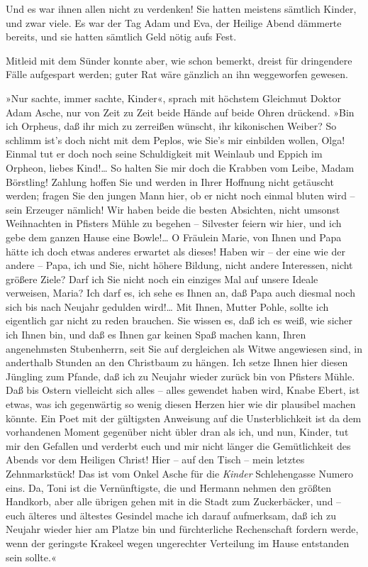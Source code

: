 Und es war ihnen allen nicht zu verdenken! Sie hatten meistens
sämtlich Kinder, und zwar viele. Es war der Tag Adam und Eva, der
Heilige Abend dämmerte bereits, und sie hatten sämtlich Geld nötig
aufs Fest.

Mitleid mit dem Sünder konnte aber, wie schon bemerkt, dreist für
dringendere Fälle aufgespart werden; guter Rat wäre gänzlich an ihn
weggeworfen gewesen.

»Nur sachte, immer sachte, Kinder«, sprach mit höchstem Gleichmut
Doktor Adam Asche, nur von Zeit zu Zeit beide Hände auf beide Ohren
drückend. »Bin ich Orpheus, daß ihr mich zu zerreißen wünscht, ihr
kikonischen Weiber? So schlimm ist's doch nicht mit dem Peplos, wie
Sie's mir einbilden wollen, Olga! Einmal tut er doch noch seine
Schuldigkeit mit Weinlaub und Eppich im Orpheon, liebes Kind!\ldots{} So
halten Sie mir doch die Krabben vom Leibe, Madam Börstling! Zahlung
hoffen Sie und werden in Ihrer Hoffnung nicht getäuscht werden;
fragen Sie den jungen Mann hier, ob er nicht noch einmal bluten
wird – sein Erzeuger nämlich! Wir haben beide die besten Absichten,
nicht umsonst Weihnachten in Pfisters Mühle zu begehen – Silvester
feiern wir hier, und ich gebe dem ganzen Hause eine Bowle!\ldots{} O
Fräulein Marie, von Ihnen und Papa hätte ich doch etwas anderes
erwartet als dieses! Haben wir – der eine wie der andere – Papa,
ich und Sie, nicht höhere Bildung, nicht andere Interessen, nicht
größere Ziele? Darf ich Sie nicht noch ein einziges Mal auf unsere
Ideale verweisen, Maria? Ich darf es, ich sehe es Ihnen an, daß
Papa auch diesmal noch sich bis nach Neujahr gedulden wird!\ldots{} Mit
Ihnen, Mutter Pohle, sollte ich eigentlich gar nicht zu reden
brauchen. Sie wissen es, daß ich es weiß, wie sicher ich Ihnen bin,
und daß es Ihnen gar keinen Spaß machen kann, Ihren angenehmsten
Stubenherrn, seit Sie auf dergleichen als Witwe angewiesen sind, in
anderthalb Stunden an den Christbaum zu hängen. Ich setze Ihnen
hier diesen Jüngling zum Pfande, daß ich zu Neujahr wieder zurück
bin von Pfisters Mühle. Daß bis Ostern vielleicht sich alles –
alles gewendet haben wird, Knabe Ebert, ist etwas, was ich
gegenwärtig so wenig diesen Herzen hier wie dir plausibel machen
könnte. Ein Poet mit der gültigsten Anweisung auf die
Unsterblichkeit ist da dem vorhandenen Moment gegenüber nicht übler
dran als ich, und nun, Kinder, tut mir den Gefallen und verderbt
euch und mir nicht länger die Gemütlichkeit des Abends vor dem
Heiligen Christ! Hier – auf den Tisch – mein letztes Zehnmarkstück!
Das ist vom Onkel Asche für die \emph{Kinder} Schlehengasse Numero
eins. Da, Toni ist die Vernünftigste, die und Hermann nehmen den
größten Handkorb, aber alle übrigen gehen mit in die Stadt zum
Zuckerbäcker, und – euch älteres und ältestes Gesindel mache ich
darauf aufmerksam, daß ich zu Neujahr wieder hier am Platze bin und
fürchterliche Rechenschaft fordern werde, wenn der geringste
Krakeel wegen ungerechter Verteilung im Hause entstanden sein
sollte.«

